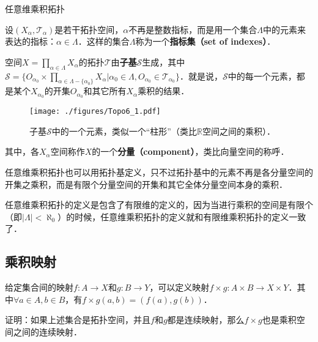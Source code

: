 \begin{definition}{任意维乘积拓扑}

设$(X_\alpha, \mathcal{T}_\alpha)$是若干拓扑空间，$\alpha$不再是整数指标，而是用一个集合$\Lambda$中的元素来表达的指标：$\alpha\in\Lambda$．这样的集合$\Lambda$称为一个\textbf{指标集（set of indexes）}．

空间$X=\prod\limits_{\alpha\in\Lambda}X_\alpha$的拓扑$\mathcal{T}$由\textbf{子基}$\mathcal{S}$生成，其中$\mathcal{S}=\{O_{\alpha_0}\times\prod\limits_{\alpha\in\Lambda-\{\alpha_0\}}X_\alpha|\alpha_0\in\Lambda, O_{\alpha_0}\in\mathcal{T}_{\alpha_0}\}$．就是说，$\mathcal{S}$中的每一个元素，都是某个$X_{\alpha_0}$的开集$O_{\alpha_0}$和其它所有$X_\alpha$乘积的结果．

\begin{figure}[ht]
\centering
\texttt{[image: ./figures/Topo6\_1.pdf]}
\caption{子基$\mathcal{S}$中的一个元素，类似一个“柱形”（类比$\mathbb{R}$空间之间的乘积）．} \label{Topo6_fig1}
\end{figure}

其中，各$X_\alpha$空间称作$X$的一个\textbf{分量（component）}，类比向量空间的称呼．

\end{definition}

任意维乘积拓扑也可以用拓扑基定义，只不过拓扑基中的元素不再是各分量空间的开集之乘积，而是有限个分量空间的开集和其它全体分量空间本身的乘积．

任意维乘积拓扑的定义是包含了有限维的定义的，因为当进行乘积的空间是有限个（即$|\Lambda|<\aleph_0$）的时候，任意维乘积拓扑的定义就和有限维乘积拓扑的定义一致了．

\subsection{乘积映射}

给定集合间的映射$f:A\rightarrow X$和$g:B\rightarrow Y$，可以定义映射$f\times g:A\times B\rightarrow X\times Y$．其中$\forall a\in A, b\in B$，有$f\times g(a, b)=(f(a), g(b))$．

\begin{exercise}{}\label{Topo6_exe1}
证明：如果上述集合是拓扑空间，并且$f$和$g$都是连续映射，那么$f\times g$也是乘积空间之间的连续映射．
\end{exercise}



